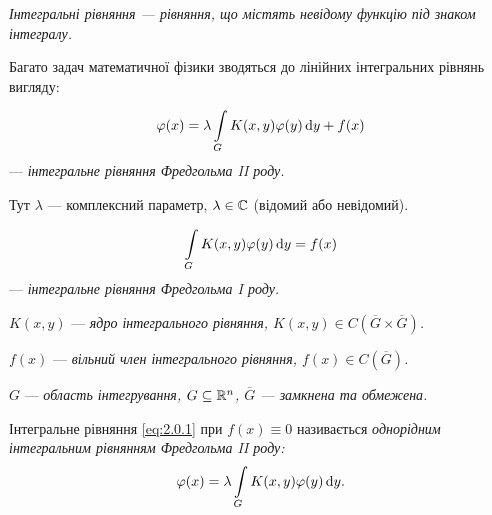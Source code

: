 \begin{definition}
	\it{Інтегральні рівняння} --- рівняння, що містять невідому функцію під знаком інтегралу.
\end{definition}

Багато задач математичної фізики зводяться до лінійних інтегральних рівнянь вигляду:

\begin{definition}
	\begin{equation}
		\label{eq:2.0.1}
		\varphi(x) = \lambda \displaystyle\int\limits_G K(x, y) \varphi(y) \mathop{}\!\mathrm{d} y + f(x)
	\end{equation}
	--- \it{інтегральне рівняння Фредгольма II роду}.
\end{definition}

Тут $\lambda$ --- комплексний параметр, $\lambda \in \mathbb{C}$ (відомий або невідомий).

\begin{definition}
	\begin{equation}
		\label{eq:2.0.2}
		\displaystyle\int\limits_G K(x, y) \varphi(y) \mathop{}\!\mathrm{d} y = f(x)
	\end{equation}
	--- \it{інтегральне рівняння Фредгольма I роду}.
\end{definition}

\begin{definition}
	$K(x, y)$ --- \it{ядро інтегрального рівняння}, $K(x, y) \in C\left(\overline G\times\overline G\right)$.
\end{definition}

\begin{definition}
	$f(x)$ --- \it{вільний член інтегрального рівняння}, $f(x) \in C\left(\overline G\right)$.
\end{definition}

\begin{definition}
	$G$ --- \it{область інтегрування}, $G \subseteq \mathbb{R}^n$, $\overline G$ --- замкнена та обмежена.
\end{definition}

\begin{definition}
	Інтегральне рівняння \eqref{eq:2.0.1} при $f(x) \equiv 0$ називається \it{однорідним інтегральним рівнянням Фредгольма II роду}:
	\begin{equation}
		\label{eq:2.0.3}
		\varphi(x) = \lambda \displaystyle\int\limits_G K(x, y) \varphi(y) \mathop{}\!\mathrm{d} y.
	\end{equation}
\end{definition}

